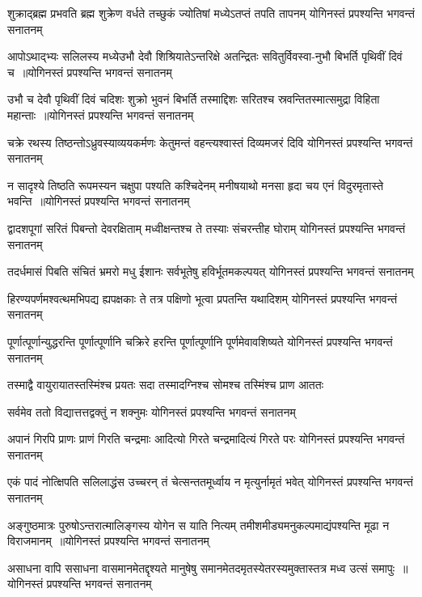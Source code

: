 \threelineshloka
{शुक्राद्ब्रह्म प्रभवति ब्रह्म शुक्रेण वर्धते}
{तच्छुकं ज्योतिषां मध्येऽतप्तं तपति तापनम्}
{योगिनस्तं प्रपश्यन्ति भगवन्तं सनातनम्}


\twolineshloka
{आपोऽथाद्भ्यः सलिलस्य मध्येउभौ देवौ शिश्रियातेऽन्तरिक्षे}
{अतन्द्रितः सवितुर्विवस्वा-नुभौ बिभर्ति पृथिवीं दिवं च ॥योगिनस्तं प्रपश्यन्ति भगवन्तं सनातनम्}


\twolineshloka
{उभौ च देवौ पृथिवीं दिवं चदिशः शुक्रो भुवनं बिभर्ति}
{तस्माद्दिशः सरितश्च स्रवन्तितस्मात्समुद्रा विहिता महान्ताः ॥योगिनस्तं प्रपश्यन्ति भगवन्तं सनातनम्}


\threelineshloka
{चक्रे रथस्य तिष्ठन्तोऽध्रुवस्याव्ययकर्मणः}
{केतुमन्तं वहन्त्यश्वास्तं दिव्यमजरं दिवि}
{योगिनस्तं प्रपश्यन्ति भगवन्तं सनातनम्}


\twolineshloka
{न सादृश्ये तिष्ठति रूपमस्यन चक्षुपा पश्यति कश्चिदेनम्}
{मनीषयाथो मनसा हृदा चय एनं विदुरमृतास्ते भवन्ति ॥योगिनस्तं प्रपश्यन्ति भगवन्तं सनातनम्}


\threelineshloka
{द्वादशपूगां सरितं पिबन्तो देवरक्षिताम्}
{मध्वीक्षन्तश्च ते तस्याः संचरन्तीह घोराम्}
{योगिनस्तं प्रपश्यन्ति भगवन्तं सनातनम्}


\threelineshloka
{तदर्धमासं पिबति संचितं भ्रमरो मधु}
{ईशानः सर्वभूतेषु हविर्भूतमकल्पयत्}
{योगिनस्तं प्रपश्यन्ति भगवन्तं सनातनम्}


\threelineshloka
{हिरण्यपर्णमश्वत्थमभिपद्य ह्यपक्षकाः}
{ते तत्र पक्षिणो भूत्वा प्रपतन्ति यथादिशम्}
{योगिनस्तं प्रपश्यन्ति भगवन्तं सनातनम्}


\threelineshloka
{पूर्णात्पूर्णान्युद्धरन्ति पूर्णात्पूर्णानि चक्रिरे}
{हरन्ति पूर्णात्पूर्णानि पूर्णमेवावशिष्यते}
{योगिनस्तं प्रपश्यन्ति भगवन्तं सनातनम्}


\twolineshloka
{तस्माद्वै वायुरायातस्तस्मिंश्च प्रयतः सदा}
{तस्मादग्निश्च सोमश्च तस्मिंश्च प्राण आततः}


\twolineshloka
{सर्वमेव ततो विद्यात्तत्तद्वक्तुं न शक्नुमः}
{योगिनस्तं प्रपश्यन्ति भगवन्तं सनातनम्}


\threelineshloka
{अपानं गिरपि प्राणः प्राणं गिरति चन्द्रमाः}
{आदित्यो गिरते चन्द्रमादित्यं गिरते परः}
{योगिनस्तं प्रपश्यन्ति भगवन्तं सनातनम्}


\threelineshloka
{एकं पादं नोत्क्षिपति सलिलाद्धंस उच्चरन्}
{तं चेत्सन्ततमूर्ध्वाय न मृत्युर्नामृतं भवेत्}
{योगिनस्तं प्रपश्यन्ति भगवन्तं सनातनम्}


\twolineshloka
{अङ्गुष्ठमात्रः पुरुषोऽन्तरात्मालिङ्गस्य योगेन स याति नित्यम्}
{तमीशमीड्यमनुकल्पमाद्यंपश्यन्ति मूढा न विराजमानम् ॥योगिनस्तं प्रपश्यन्ति भगवन्तं सनातनम्}


\twolineshloka
{असाधना वापि ससाधना वासमानमेतद्दृश्यते मानुषेषु}
{समानमेतदमृतस्येतरस्यमुक्तास्तत्र मध्व उत्सं समापुः ॥योगिनस्तं प्रपश्यन्ति भगवन्तं सनातनम्}


